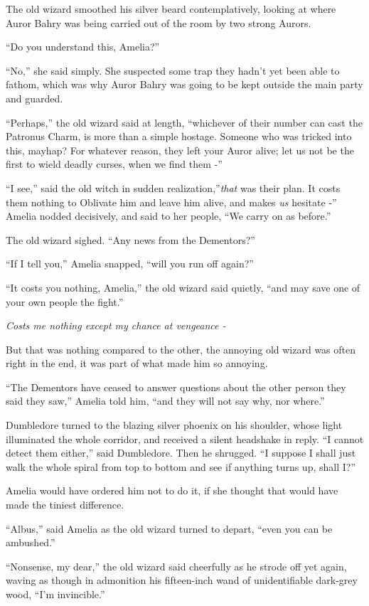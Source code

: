 The old wizard smoothed his silver beard contemplatively, looking at
where Auror Bahry was being carried out of the room by two strong
Aurors.

``Do you understand this, Amelia?''

``No,'' she said simply. She suspected some trap they hadn't yet been
able to fathom, which was why Auror Bahry was going to be kept outside
the main party and guarded.

``Perhaps,'' the old wizard said at length, ``whichever of their number
can cast the Patronus Charm, is more than a simple hostage. Someone who
was tricked into this, mayhap? For whatever reason, they left your Auror
alive; let us not be the first to wield deadly curses, when we find them
-''

``I see,'' said the old witch in sudden realization,''\emph{that} was
their plan. It costs them nothing to Oblivate him and leave him alive,
and makes \emph{us} hesitate -'' Amelia nodded decisively, and said to
her people, ``We carry on as before.''

The old wizard sighed. ``Any news from the Dementors?''

``If I tell you,'' Amelia snapped, ``will you run off again?''

``It costs you nothing, Amelia,'' the old wizard said quietly, ``and may
save one of your own people the fight.''

\emph{Costs me nothing except my chance at vengeance -}

But that was nothing compared to the other, the annoying old wizard was
often right in the end, it was part of what made him so annoying.

``The Dementors have ceased to answer questions about the other person
they said they saw,'' Amelia told him, ``and they will not say why, nor
where.''

Dumbledore turned to the blazing silver phoenix on his shoulder, whose
light illuminated the whole corridor, and received a silent headshake in
reply. ``I cannot detect them either,'' said Dumbledore. Then he
shrugged. ``I suppose I shall just walk the whole spiral from top to
bottom and see if anything turns up, shall I?''

Amelia would have ordered him not to do it, if she thought that would
have made the tiniest difference.

``Albus,'' said Amelia as the old wizard turned to depart, ``even you
can be ambushed.''

``Nonsense, my dear,'' the old wizard said cheerfully as he strode off
yet again, waving as though in admonition his fifteen-inch wand of
unidentifiable dark-grey wood, ``I'm invincible.''

